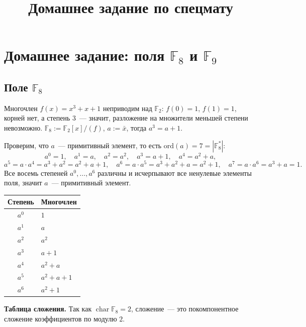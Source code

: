 \documentclass[12pt,a4paper]{article}
\title{Домашнее задание по спецмату}
\author{}
\date{}
\newcommand{\ord}{\text{ord}}
\begin{document}
	\maketitle
	
	\section*{Домашнее задание: поля $\mathbb{F}_8$ и $\mathbb{F}_9$}
    
    \subsection*{Поле $\mathbb{F}_8$}
    
    \begin{example}
    	Многочлен $f(x) = x^3+x+1$ неприводим над $\mathbb{F}_2$: $f(0)=1$, $f(1)=1$, корней нет, а степень $3$~--- значит, разложение на множители меньшей степени невозможно. $\mathbb{F}_8 := \mathbb{F}_2[x]/(f)$, $a := \bar x$, тогда $a^3 = a+1$.
    
    	Проверим, что $a$~--- примитивный элемент, то есть $\ord(a) = 7 = |\mathbb{F}_8^*|$:
    	\[
    		a^0=1,\quad a^1=a,\quad a^2=a^2,\quad a^3=a+1,\quad a^4=a^2+a,
    	\]
    	\[
    		a^5=a\cdot a^4=a^3+a^2=a^2+a+1,\quad a^6=a\cdot a^5=a^3+a^2+a=a^2+1,\quad a^7=a\cdot a^6=a^3+a=1.
    	\]
    	Все восемь степеней $a^0,\dots,a^6$ различны и исчерпывают все ненулевые элементы поля, значит $a$~--- примитивный элемент.
    \end{example}
    
    \begin{center}
    	\begin{xltabular}{0.7\textwidth}{|c|X|}
    		\hline
    		\textbf{Степень} & \textbf{Многочлен}\\
    		\hline
    		$a^0$ & $1$\\
    		\hline
    		$a^1$ & $a$\\
    		\hline
    		$a^2$ & $a^2$\\
    		\hline
    		$a^3$ & $a+1$\\
    		\hline
    		$a^4$ & $a^2+a$\\
    		\hline
    		$a^5$ & $a^2+a+1$\\
    		\hline
    		$a^6$ & $a^2+1$\\
    		\hline
    	\end{xltabular}
    \end{center}
    
    \noindent\textbf{Таблица сложения.} Так как $\operatorname{char}\mathbb{F}_8 = 2$, сложение~--- это покомпонентное сложение коэффициентов по модулю $2$.
    
\end{document}
